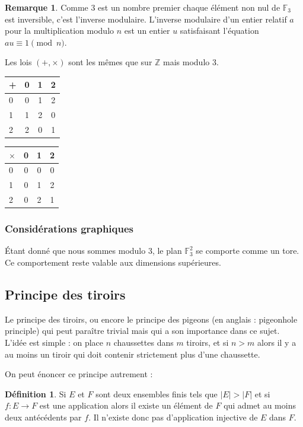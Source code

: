 \documentclass[a4paper,12pt,titlepage]{article}
\theoremstyle{plain}
\theoremstyle{definition}
\newtheorem{defi}{Définition}
\newtheorem{rmq}{Remarque}
\newcommand{\Ftrois}[1]{\mathbb{F}^#1_3}
\begin{document}
\begin{rmq}
Comme 3 est un nombre premier chaque élément non nul de $\mathbb{F}_3$ est inversible, c'est l'inverse modulaire. L'inverse modulaire d'un entier relatif $a$ pour la multiplication modulo $n$ est un entier $u$ satisfaisant l'équation $au \equiv 1 \pmod{n}$.
\end{rmq}

Les lois $(+,\times)$ sont les mêmes que sur $\mathbb{Z}$ mais modulo 3.
\begin{center}
\begin{tabular}{ l | c c c }
+ & 0 & 1 & 2 \\
\hline
0 & 0 & 1 & 2\\
1 & 1 & 2 & 0\\
2 & 2 & 0 & 1\\
\end{tabular}
\qquad
\begin{tabular}{ l | c c c }
$\times$ & 0 & 1 & 2 \\
\hline
0 & 0 & 0 & 0\\
1 & 0 & 1 & 2\\
2 & 0 & 2 & 1\\
\end{tabular}
\end{center}
\subsubsection{Considérations graphiques}
\'{E}tant donné que nous sommes modulo 3, le plan $\Ftrois{2}$ se comporte comme un tore.
Ce comportement reste valable aux dimensions supérieures.
\subsection{Principe des tiroirs}
Le principe des tiroirs, ou encore le principe des pigeons (en anglais : pigeonhole principle) qui peut paraître trivial mais qui a son importance dans ce sujet.
L’idée est simple : on place $n$ chaussettes dans $m$ tiroirs, et si $n>m$ alors il y a au moins un tiroir qui doit contenir strictement plus d’une chaussette.

On peut énoncer ce principe autrement : 
\begin{defi}
Si $E$ et $F$ sont deux ensembles finis tels que $|E|>|F|$ et si $f:E \to F$ est une application alors il existe un élément de $F$ qui admet au moins deux
antécédents par $f$. 
Il n’existe donc pas d’application injective de $E$ dans $F$.
\end{defi}
\end{document}

